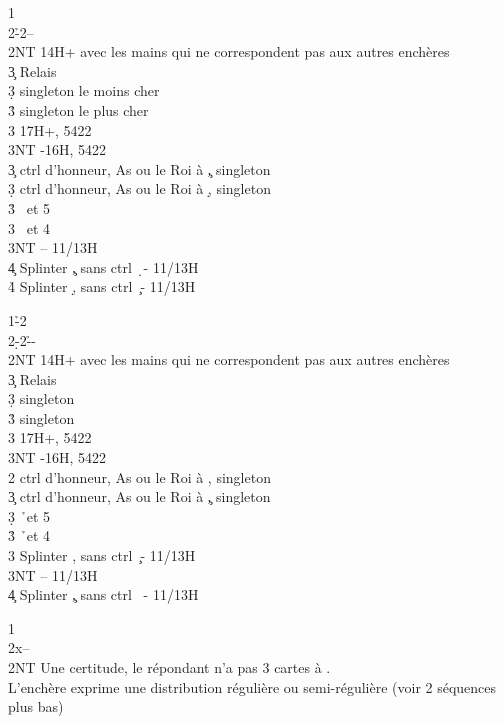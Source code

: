\documentclass[a4paper]{article}
\begin{document}
\begin{bidtable}
1\c\\
2\h-2\s--\\
2NT \> 14H+ avec les mains qui ne correspondent pas aux autres enchères\+\\
3\c \> Relais\+\\
3\d \> singleton le moins cher\\
3\h \> singleton le plus cher\\
3\s \> 17H+, 5422\\
3NT -16H, 5422\-\-\\
3\c \> ctrl d’honneur, As ou le Roi à \c , singleton \d \\
3\d \> ctrl d’honneur, As ou le Roi à \d , singleton \c \\
3\h {} \s\ et 5 \h \\
3\s {} \s\ et 4 \h \\
3NT  – 11/13H\\
4\c \> Splinter \c , sans ctrl \d\ - 11/13H\\
4\h \> Splinter \d , sans ctrl \c\ - 11/13H
\end{bidtable}

\begin{bidtable}
1\h-2\c\\
2\d-2\h--\\
2NT \> 14H+ avec les mains qui ne correspondent pas aux autres enchères\+\\
3\c \> Relais\+\\
3\d \> singleton \c \\
3\h \> singleton \s \\
3\s \> 17H+, 5422\\
3NT -16H, 5422\-\-\\
2\s \> ctrl d’honneur, As ou le Roi à \s , singleton \c \\
3\c \> ctrl d’honneur, As ou le Roi à \c , singleton \s \\
3\d {} \h\ et 5 \d \\
3\h {} \h\ et 4 \d \\
3\s \> Splinter \s , sans ctrl \c\ - 11/13H\\
3NT  – 11/13H\\
4\c \> Splinter \c , sans ctrl \s\ - 11/13H
\end{bidtable}

\begin{bidtable}
1\c\\
2x--\\
2NT \> Une certitude, le répondant n’a pas 3 cartes à \s .\+\\
L’enchère \> exprime une distribution régulière ou semi-régulière (voir 2 séquences plus bas)\-
\end{bidtable}
\end{document}
